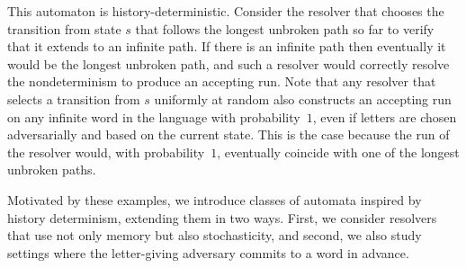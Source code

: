 This automaton is history-deterministic. Consider the resolver that chooses the transition from state $s$ that follows the longest unbroken path so far to verify that it extends to an infinite path. If there is an infinite path then eventually it would be the longest unbroken path, and such a resolver would correctly resolve the nondeterminism to produce an accepting run. Note that any resolver that selects a transition from $s$ uniformly at random also constructs an accepting run on any infinite word in the language with probability~$1$, even if letters are chosen adversarially and based on the current state. This is the case because the run of the resolver would, with probability~$1$, eventually coincide with one of the longest unbroken paths. %


Motivated by these examples, we introduce classes of automata inspired by history determinism, extending them in two ways. First, we consider resolvers that use not only memory but also stochasticity, and second, we also study settings where the letter-giving adversary commits to a word in advance.%

